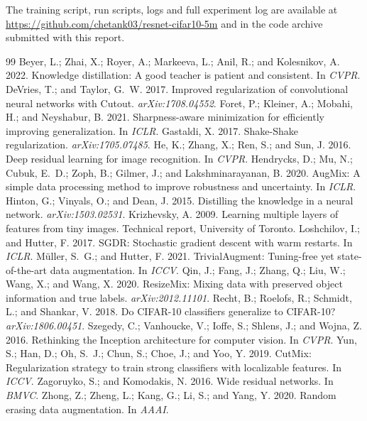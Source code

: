\documentclass[letterpaper,10pt,twocolumn]{article}
\makeatletter
\renewcommand\paragraph{\@startsection{paragraph}{4}{\z@}{0.6ex plus .2ex}{-1em}{\normalfont\normalsize\bfseries}}
\makeatother
\begin{document}
\paragraph{Code.} The training script, run scripts, logs and full experiment log are available at \url{https://github.com/chetank03/resnet-cifar10-5m} and in the code archive submitted with this report.

\small
\begin{thebibliography}{99}\setlength{\itemsep}{0pt}
 Beyer, L.; Zhai, X.; Royer, A.; Markeeva, L.; Anil, R.; and Kolesnikov, A. 2022. Knowledge distillation: A good teacher is patient and consistent. In \textit{CVPR}.
 DeVries, T.; and Taylor, G.~W. 2017. Improved regularization of convolutional neural networks with Cutout. \textit{arXiv:1708.04552}.
 Foret, P.; Kleiner, A.; Mobahi, H.; and Neyshabur, B. 2021. Sharpness-aware minimization for efficiently improving generalization. In \textit{ICLR}.
 Gastaldi, X. 2017. Shake-Shake regularization. \textit{arXiv:1705.07485}.
 He, K.; Zhang, X.; Ren, S.; and Sun, J. 2016. Deep residual learning for image recognition. In \textit{CVPR}.
 Hendrycks, D.; Mu, N.; Cubuk, E.~D.; Zoph, B.; Gilmer, J.; and Lakshminarayanan, B. 2020. AugMix: A simple data processing method to improve robustness and uncertainty. In \textit{ICLR}.
 Hinton, G.; Vinyals, O.; and Dean, J. 2015. Distilling the knowledge in a neural network. \textit{arXiv:1503.02531}.
 Krizhevsky, A. 2009. Learning multiple layers of features from tiny images. Technical report, University of Toronto.
 Loshchilov, I.; and Hutter, F. 2017. SGDR: Stochastic gradient descent with warm restarts. In \textit{ICLR}.
 M\"uller, S.~G.; and Hutter, F. 2021. TrivialAugment: Tuning-free yet state-of-the-art data augmentation. In \textit{ICCV}.
 Qin, J.; Fang, J.; Zhang, Q.; Liu, W.; Wang, X.; and Wang, X. 2020. ResizeMix: Mixing data with preserved object information and true labels. \textit{arXiv:2012.11101}.
 Recht, B.; Roelofs, R.; Schmidt, L.; and Shankar, V. 2018. Do CIFAR-10 classifiers generalize to CIFAR-10? \textit{arXiv:1806.00451}.
 Szegedy, C.; Vanhoucke, V.; Ioffe, S.; Shlens, J.; and Wojna, Z. 2016. Rethinking the Inception architecture for computer vision. In \textit{CVPR}.
 Yun, S.; Han, D.; Oh, S.~J.; Chun, S.; Choe, J.; and Yoo, Y. 2019. CutMix: Regularization strategy to train strong classifiers with localizable features. In \textit{ICCV}.
 Zagoruyko, S.; and Komodakis, N. 2016. Wide residual networks. In \textit{BMVC}.
 Zhong, Z.; Zheng, L.; Kang, G.; Li, S.; and Yang, Y. 2020. Random erasing data augmentation. In \textit{AAAI}.
\end{thebibliography}
\end{document}
